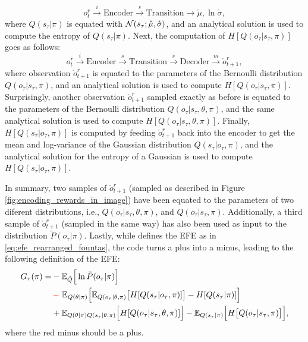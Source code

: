 \documentclass[twoside,11pt]{article}
\let\oldmathcal\mathcal
\renewcommand{\mathcal}[1]{%
  \IfSubStr{ABCDEFGHIJKLMNOPQRSTUVWXYZ}{#1}{\oldmathcal{#1}}{\mathdutchcal{#1}}
}
\begin{document}
$$o_t^r \overset{i}{\rightarrow} \text{Encoder} \overset{s}{\rightarrow} \text{Transition} \rightarrow \mathring{\mu}, \ln \mathring{\sigma},$$
where $Q(s_\tau|\pi)$ is equated with $\mathcal{N}(s_\tau;\mathring{\mu}, \mathring{\sigma})$, and an analytical solution is used to compute the entropy of $Q(s_\tau|\pi)$. Next, the computation of $H[Q(o_\tau|s_\tau, \pi)]$ goes as follows:
$$o_t^r \overset{i}{\rightarrow} \text{Encoder} \overset{s}{\rightarrow} \text{Transition} \overset{s}{\rightarrow} \text{Decoder} \overset{m}{\rightarrow} \mathring{o}^r_{t+1},$$
where observation $\mathring{o}^r_{t+1}$ is equated to the parameters of the Bernoulli distribution $Q(o_\tau|s_\tau, \pi)$, and an analytical solution is used to compute $H[Q(o_\tau|s_\tau, \pi)]$. Surprisingly, another observation $\mathring{o}^r_{t+1}$ sampled exactly as before is equated to the parameters of the Bernoulli distribution $Q(o_\tau|s_\tau,\theta,\pi)$, and the same analytical solution is used to compute $H[Q(o_\tau|s_\tau,\theta,\pi)]$. Finally, $H[Q(s_\tau|o_\tau, \pi)]$ is computed by feeding $\mathring{o}^r_{t+1}$ back into the encoder to get the mean and log-variance of the Gaussian distribution $Q(s_\tau|o_\tau, \pi)$, and the analytical solution for the entropy of a Gaussian is used to compute $H[Q(s_\tau|o_\tau, \pi)]$.

In summary, two samples of $\mathring{o}^r_{t+1}$ (sampled as described in Figure \ref{fig:encoding_rewards_in_image}) have been equated to the parameters of two diferent distributions, i.e., $Q(o_\tau|s_\tau,\theta,\pi)$, and $Q(o_\tau|s_\tau, \pi)$. Additionally, a third sample of $\mathring{o}^r_{t+1}$ (sampled in the same way) has also been used as input to the distribution $\tilde{P}(o_\tau|\pi)$. Lastly, while \citet{DeepAIwithMCMC} defines the EFE as in \eqref{eq:efe_rearranged_fountas}, the code turns a plus into a minus, leading to the following definition of the EFE:
\begin{align*}
G_{\tau}(\pi) = &- \mathbb{E}_{\tilde{Q}}\Big[ \ln \tilde{P}(o_\tau|\pi)\Big]\nonumber\\
&\,{\color{red}-} \,\, \mathbb{E}_{Q(\theta|\pi)}\Big[ \mathbb{E}_{Q(o_\tau|\theta,\pi)}\big[H[Q(s_\tau|o_\tau, \pi)]\big] - H[Q(s_\tau|\pi)] \Big]\nonumber\\
&+ \mathbb{E}_{Q(\theta|\pi)Q(s_\tau|\theta,\pi)}\Big[H[Q(o_\tau|s_\tau,\theta,\pi)] \Big] - \mathbb{E}_{Q(s_\tau|\pi)}\Big[ H\big[ Q(o_\tau|s_\tau, \pi) \big] \Big],
\end{align*}
where the red minus should be a plus.
\end{document}
